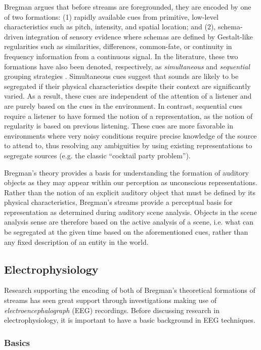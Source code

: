 \documentclass[a4paper,10pt,final]{ThesisStyle}
\begin{document}
Bregman argues that before streams are foregrounded, they are encoded by one of two formations: (1) rapidly available cues from primitive, low-level characteristics such as pitch, intensity, and spatial location; and (2), schema-driven integration of sensory evidence where schemas are defined by Gestalt-like regularities such as similarities, differences, common-fate, or continuity in frequency information from a continuous signal.  In the literature, these two formations have also been denoted, respectively, as \textit{simultaneous} and \textit{sequential} grouping strategies \cite{Winkler2009a}.  Simultaneous cues suggest that sounds are likely to be segregated if their physical characteristics despite their context are significantly varied.  As a result, these cues are independent of the attention of a listener and are purely based on the cues in the environment.  In contrast, sequential cues require a listener to have formed the notion of a representation, as the notion of regularity is based on previous listening.  These cues are more favorable in environments where very noisy conditions require precise knowledge of the source to attend to, thus resolving any ambiguities by using existing representations to segregate sources (e.g. the classic ``cocktail party problem'').  

Bregman's theory provides a basis for understanding the formation of auditory objects as they may appear within our perception as unconscious representations.  Rather than the notion of an explicit auditory object that must be defined by its physical characteristics, Bregman's streams provide a perceptual basis for representation as determined during auditory scene analysis.  Objects in the scene analysis sense are therefore based on the active analysis of a scene, i.e. what can be segregated at the given time based on the aforementioned cues, rather than any fixed description of an entity in the world.  

\subsection{Electrophysiology}

Research supporting the encoding of both of Bregman's theoretical formations of streams has seen great support through investigations making use of \textit{electroencephalograph} (EEG) recordings.   Before discussing research in electrophysiology, it is important to have a basic background in EEG techniques.  

\subsubsection{Basics}
\end{document}
